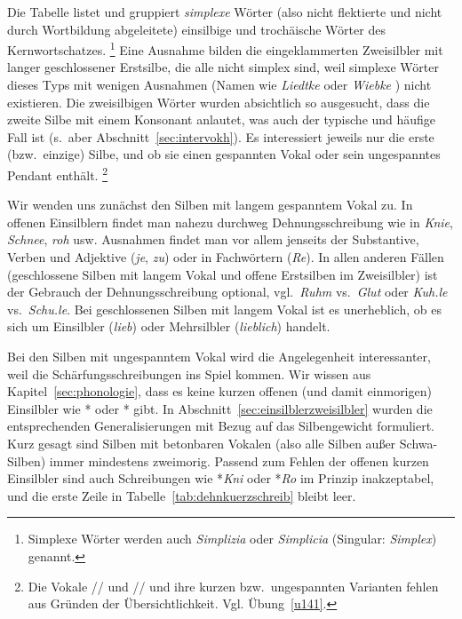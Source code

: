 Die Tabelle listet und gruppiert \textit{simplexe} Wörter (also nicht flektierte und nicht durch Wortbildung abgeleitete) einsilbige und trochäische Wörter des Kernwortschatzes.%
\footnote{Simplexe Wörter werden auch \textit{Simplizia} oder \textit{Simplicia} (Singular: \textit{Simplex}) genannt.}
Eine Ausnahme bilden die eingeklammerten Zweisilbler mit langer geschlossener Erstsilbe, die alle nicht simplex sind, weil simplexe Wörter dieses Typs mit wenigen Ausnahmen (\zB Namen wie \textit{Liedtke} \textipa{[li:tk@]} oder \textit{Wiebke} \textipa{[vi:pk@]}) nicht existieren.\label{abs:wiebke}
Die zweisilbigen Wörter wurden absichtlich so ausgesucht, dass die zweite Silbe mit einem Konsonant anlautet, was auch der typische und häufige Fall ist (s.\ aber Abschnitt~\ref{sec:intervokh}).
Es interessiert jeweils nur die erste (bzw.\ einzige) Silbe, und ob sie einen gespannten Vokal oder sein ungespanntes Pendant enthält.%
\footnote{Die Vokale /\textipa{\o}/ und // und ihre kurzen bzw.\ ungespannten Varianten fehlen aus Gründen der Übersichtlichkeit.
Vgl. Übung~\ref{u141}.}

Wir wenden uns zunächst den Silben mit langem gespanntem Vokal zu.
In offenen Einsilblern findet man nahezu durchweg Dehnungsschreibung wie in \textit{Knie}, \textit{Schnee}, \textit{roh} usw.
Ausnahmen findet man vor allem jenseits der Substantive, Verben und Adjektive (\zB \textit{je}, \textit{zu}) oder in Fachwörtern (\zB \textit{Re}).
In allen anderen Fällen (geschlossene Silben mit langem Vokal und offene Erstsilben im Zweisilbler) ist der Gebrauch der Dehnungsschreibung optional, vgl.\ \textit{Ruhm} vs.\ \textit{Glut} oder \textit{Kuh.le} vs.\ \textit{Schu.le}.
Bei geschlossenen Silben mit langem Vokal ist es unerheblich, ob es sich um Einsilbler (\textit{lieb}) oder Mehrsilbler (\textit{lieblich}) handelt.

Bei den Silben mit ungespanntem Vokal wird die Angelegenheit interessanter, weil die Schärfungsschreibungen ins Spiel kommen.
Wir wissen aus Kapitel~\ref{sec:phonologie}, dass es keine kurzen offenen (und damit einmorigen) Einsilbler wie *\textipa{[knI]} oder *\textipa{[KO]} gibt.
In Abschnitt~\ref{sec:einsilblerzweisilbler} wurden die entsprechenden Generalisierungen mit Bezug auf das Silbengewicht formuliert.
Kurz gesagt sind Silben mit betonbaren Vokalen (also alle Silben außer Schwa-Silben) immer mindestens zweimorig.
Passend zum Fehlen der offenen kurzen Einsilbler sind auch Schreibungen wie *\textit{Kni} oder *\textit{Ro} im Prinzip inakzeptabel, und die erste Zeile in Tabelle~\ref{tab:dehnkuerzschreib} bleibt leer.

